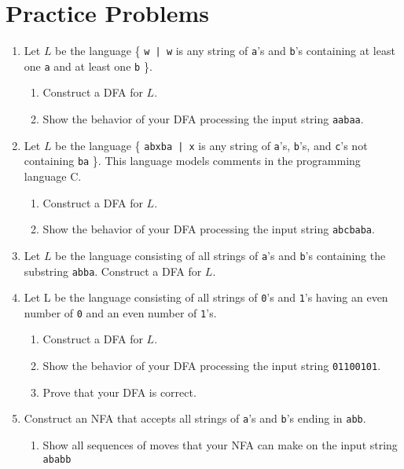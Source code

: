 \documentclass[]{article}
\begin{document}
\section{Practice Problems}
  \begin{enumerate}
    \item Let $L$ be the language \{ \texttt{w | w} is any string of
    \texttt{a}'s and \texttt{b}'s containing at least one \texttt{a} and at
    least one \texttt{b} \}.
      \begin{enumerate}
        \item Construct a DFA for $L$.
        \item Show the behavior of your DFA processing the input string
        \texttt{aabaa}.
      \end{enumerate}
    \item Let $L$ be the language \{ \texttt{abxba | x} is any string of
    \texttt{a}'s, \texttt{b}'s, and \texttt{c}'s not containing
    \texttt{ba} \}.
    This language models comments in the programming language C.
      \begin{enumerate}
        \item Construct a DFA for $L$.
        \item Show the behavior of your DFA processing the input string
        \texttt{abcbaba}.
      \end{enumerate}
    \item Let $L$ be the language consisting of all strings of \texttt{a}'s
    and \texttt{b}'s containing the substring \texttt{abba}. Construct a DFA
    for $L$.
    \item Let L be the language consisting of all strings of \texttt{0}'s and
    \texttt{1}'s having an even number of \texttt{0} and an even number of
    \texttt{1}'s.
      \begin{enumerate}
        \item Construct a DFA for $L$.
        \item Show the behavior of your DFA processing the input string
        \texttt{01100101}.
        \item Prove that your DFA is correct.
      \end{enumerate}
    \item Construct an NFA that accepts all strings of \texttt{a}'s and
    \texttt{b}'s ending in \texttt{abb}.
      \begin{enumerate}
        \item Show all sequences of moves that your NFA can make on the input
        string \texttt{ababb}

\end{enumerate}
\end{enumerate}
\end{document}
